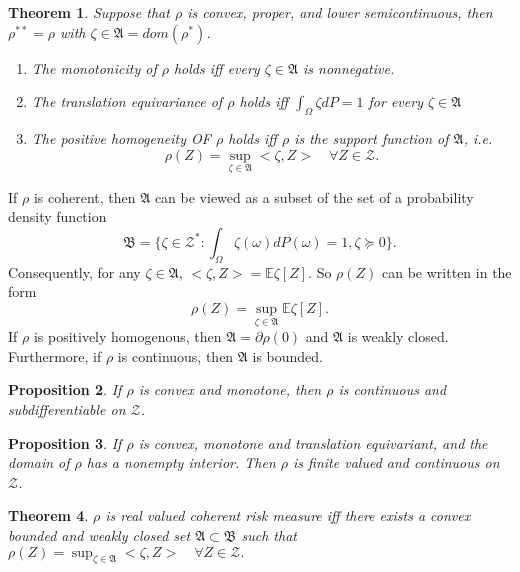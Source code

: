 \documentclass[a4pper,11pt]{article}
\newcommand{\be}{\mathbb E}
\newtheorem{thm}{Theorem}[section]
\newtheorem{prop}[thm]{Proposition}
\begin{document}
\begin{thm}
Suppose that $\rho$ is convex, proper, and lower semicontinuous, then $\rho^{**}=\rho$ with $\zeta\in \mathfrak A=dom(\rho^*)$. 
\begin{enumerate}
	\item The monotonicity of $\rho$ holds iff every $\zeta\in \mathfrak A$ is nonnegative.
	\item The translation equivariance of $\rho$ holds iff $\int_\Omega \zeta dP=1$ for every $\zeta\in\mathfrak A$
	\item The positive homogeneity OF $\rho$ holds iff $\rho$ is the support function of $\mathfrak A$, i.e. 
	$$\rho(Z)=\sup_{\zeta\in \mathfrak A}<\zeta,Z> \quad \forall Z\in \mathcal Z.$$
\end{enumerate}
\end{thm}
If $\rho$ is coherent, then $\mathfrak A$ can be viewed as a subset of  the set of a probability density function
$$\mathfrak B =\{\zeta \in \mathcal Z^*:\int_\Omega \zeta(\omega)dP(\omega)=1,\zeta\succeq 0\}.$$ Consequently, for any $\zeta\in\mathfrak A$, $<\zeta,Z>=\be \zeta[Z]$. So $\rho(Z)$ can be written in the form
$$\rho(Z)=\sup_{\zeta\in \mathfrak A}\be \zeta[Z].$$
If $\rho$ is positively homogenous, then $\mathfrak A=\partial \rho(0)$ and $\mathfrak A$ is weakly closed. Furthermore, if $\rho$ is continuous, then $\mathfrak A$ is bounded.

\begin{prop}If $\rho$ is convex and monotone, then $\rho$ is continuous and subdifferentiable on $\mathcal Z$.
\end{prop}
\begin{prop}If $\rho$ is convex, monotone and translation equivariant, and the domain of $\rho$ has a nonempty interior. Then $\rho$ is finite valued and continuous on $\mathcal Z$.
\end{prop}
\begin{thm}
$\rho$ is real valued coherent risk measure iff there exists a convex bounded and weakly closed set $\mathfrak A\subset \mathfrak B$ such that $\rho(Z)=\sup_{\zeta\in \mathfrak A}<\zeta,Z> \quad \forall Z\in \mathcal Z.$
\end{thm}
\end{document}
